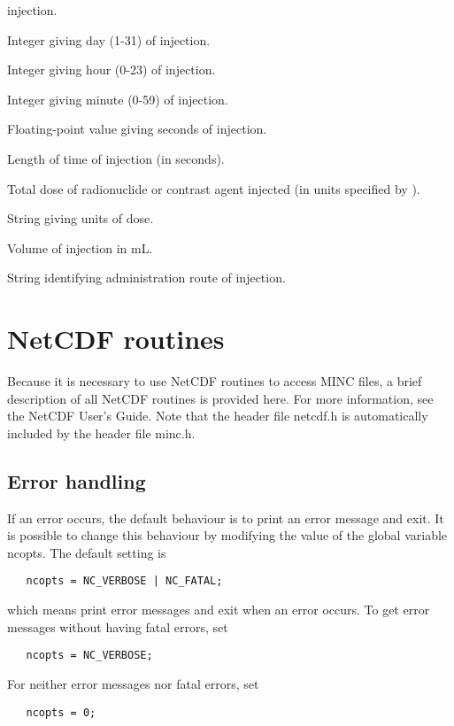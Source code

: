 \begin{description}
      injection.
   \item [\code{MIinjection\_day}] Integer giving day (1-31) of
      injection.
   \item [\code{MIinjection\_hour}] Integer giving hour (0-23) of
      injection.
   \item [\code{MIinjection\_minute}] Integer giving minute (0-59) of
      injection.
   \item [\code{MIinjection\_seconds}] Floating-point value giving
      seconds of injection. 
   \item [\code{MIinjection\_length}] Length of time of injection (in
      seconds).
   \item [\code{MIinjection\_dose}] Total dose of radionuclide or contrast
      agent injected (in units specified by ).
   \item [\code{MIdose\_units}] String giving units of dose.
   \item [\code{MIinjection\_volume}] Volume of injection in mL.
   \item [\code{MIinjection\_route}] String identifying administration
      route of injection.
\end{description}

\section{NetCDF routines}

Because it is necessary to use NetCDF routines to access MINC files, a
brief description of all NetCDF routines is provided here. For more
information, see the NetCDF User's Guide. Note that the header file
netcdf.h is automatically included by the header file minc.h.

\subsection{Error handling}

If an error occurs, the default behaviour is to print an error message
and exit. It is possible to change this behaviour by modifying the
value of the global variable ncopts. The default setting is 
\begin{verbatim}
   ncopts = NC_VERBOSE | NC_FATAL;
\end{verbatim}
which means print error messages and exit when an error occurs. To
get error messages without having fatal errors, set 
\begin{verbatim}
   ncopts = NC_VERBOSE;
\end{verbatim}
For neither error messages nor fatal errors, set
\begin{verbatim}
   ncopts = 0;
\end{verbatim}

